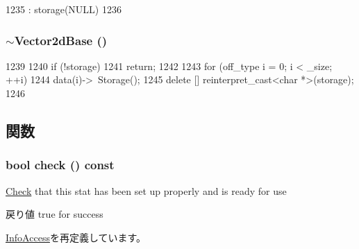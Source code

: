 \begin{DoxyCode}
1235         : storage(NULL)
1236     {}
\end{DoxyCode}
\hypertarget{classStats_1_1Vector2dBase_ab86c0e4e60f8e58a88b7e1945188b243}{
\subsubsection[{$\sim$Vector2dBase}]{\setlength{\rightskip}{0pt plus 5cm}$\sim${\bf Vector2dBase} ()}}
\label{classStats_1_1Vector2dBase_ab86c0e4e60f8e58a88b7e1945188b243}



\begin{DoxyCode}
1239     {
1240         if (!storage)
1241             return;
1242 
1243         for (off_type i = 0; i < _size; ++i)
1244             data(i)->~Storage();
1245         delete [] reinterpret_cast<char *>(storage);
1246     }
\end{DoxyCode}


\subsection{関数}
\hypertarget{classStats_1_1Vector2dBase_a6ecddb2c44556b7acbc1723a968ff8bb}{
\subsubsection[{check}]{\setlength{\rightskip}{0pt plus 5cm}bool check () const}}
\label{classStats_1_1Vector2dBase_a6ecddb2c44556b7acbc1723a968ff8bb}
\hyperlink{classCheck}{Check} that this stat has been set up properly and is ready for use \begin{DoxyReturn}{戻り値}
true for success 
\end{DoxyReturn}


\hyperlink{classStats_1_1InfoAccess_a6ecddb2c44556b7acbc1723a968ff8bb}{InfoAccess}を再定義しています。


